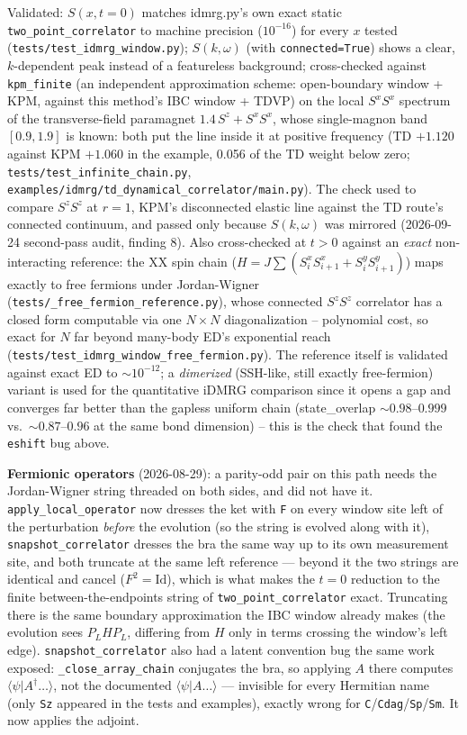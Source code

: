 \documentclass[11pt]{article}
\begin{document}
Validated: $S(x,t{=}0)$ matches idmrg.py's own exact static
\texttt{two\_point\_correlator} to machine precision ($10^{-16}$) for
every $x$ tested (\texttt{tests/test\_idmrg\_window.py}); $S(k,\omega)$
(with \texttt{connected=True}) shows a clear, $k$-dependent peak
instead of a featureless background; cross-checked against
\texttt{kpm\_finite} (an independent approximation scheme:
open-boundary window + KPM, against this method's IBC window + TDVP) on
the local $S^xS^x$ spectrum of the transverse-field paramagnet
$1.4\,S^z + S^xS^x$, whose single-magnon band $[0.9,1.9]$ is known: both
put the line inside it at positive frequency (TD $+1.120$ against KPM
$+1.060$ in the example, 0.056 of the TD weight below zero;
\texttt{tests/test\_infinite\_chain.py},
\texttt{examples/idmrg/td\_dynamical\_correlator/main.py}). The check
used to compare $S^zS^z$ at $r=1$, KPM's disconnected elastic line
against the TD route's connected continuum, and passed only because
$S(k,\omega)$ was mirrored (2026-09-24 second-pass audit, finding 8). Also
cross-checked at $t>0$ against an \emph{exact} non-interacting
reference: the XX spin chain ($H=J\sum(S^x_iS^x_{i+1}+S^y_iS^y_{i+1})$)
maps exactly to free fermions under Jordan-Wigner
(\texttt{tests/\_free\_fermion\_reference.py}), whose connected
$S^zS^z$ correlator has a closed form computable via one $N{\times}N$
diagonalization -- polynomial cost, so exact for $N$ far beyond
many-body ED's exponential reach
(\texttt{tests/test\_idmrg\_window\_free\_fermion.py}). The reference
itself is validated against exact ED to $\sim 10^{-12}$; a
\emph{dimerized} (SSH-like, still exactly free-fermion) variant is used
for the quantitative iDMRG comparison since it opens a gap and converges
far better than the gapless uniform chain (state\_overlap
$\sim 0.98$--$0.999$ vs.\ $\sim 0.87$--$0.96$ at the same bond
dimension) -- this is the check that found the \texttt{eshift} bug
above.

\textbf{Fermionic operators} (2026-08-29): a parity-odd pair on this
path needs the Jordan-Wigner string threaded on both sides, and did not
have it. \texttt{apply\_local\_operator} now dresses the ket with
\texttt{F} on every window site left of the perturbation \emph{before}
the evolution (so the string is evolved along with it),
\texttt{snapshot\_correlator} dresses the bra the same way up to its own
measurement site, and both truncate at the same left reference --- beyond
it the two strings are identical and cancel ($F^2=\mathrm{Id}$), which is
what makes the $t=0$ reduction to the finite between-the-endpoints string
of \texttt{two\_point\_correlator} exact. Truncating there is the same
boundary approximation the IBC window already makes (the evolution sees
$P_L H P_L$, differing from $H$ only in terms crossing the window's left
edge). \texttt{snapshot\_correlator} also had a latent convention bug the
same work exposed: \texttt{\_close\_array\_chain} conjugates the bra, so
applying $A$ there computes $\langle\psi|A^\dagger\ldots\rangle$, not the
documented $\langle\psi|A\ldots\rangle$ --- invisible for every Hermitian
name (only \texttt{Sz} appeared in the tests and examples), exactly wrong
for \texttt{C}/\texttt{Cdag}/\texttt{Sp}/\texttt{Sm}. It now applies the
adjoint.
\end{document}
